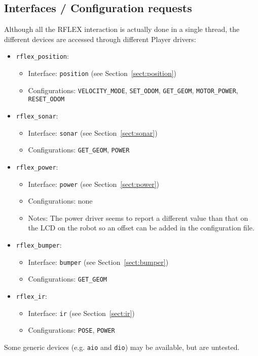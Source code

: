 \subsection*{Interfaces / Configuration requests}
Although all the RFLEX interaction is actually done in a single thread, the
different devices are accessed through different Player drivers:
\begin{itemize}
\item {\tt rflex\_position}:
  \begin{itemize}
  \item Interface: {\tt position} (see Section~\ref{sect:position})
  \item Configurations: {\tt VELOCITY\_MODE}, {\tt SET\_ODOM},
                        {\tt GET\_GEOM}, {\tt MOTOR\_POWER},
                        {\tt RESET\_ODOM}
  \end{itemize}
\item {\tt rflex\_sonar}:
  \begin{itemize}
  \item Interface: {\tt sonar} (see Section~\ref{sect:sonar})
  \item Configurations: {\tt GET\_GEOM}, {\tt POWER}
  \end{itemize}
\item {\tt rflex\_power}:
  \begin{itemize}
  \item Interface: {\tt power} (see Section~\ref{sect:power})
  \item Configurations: none
  \item Notes: The power driver seems to report a different value than that on the LCD on the robot so
  an offset can be added in the configuration file.
  \end{itemize}
\item {\tt rflex\_bumper}:
  \begin{itemize}
  \item Interface: {\tt bumper} (see Section~\ref{sect:bumper})
  \item Configurations: {\tt GET\_GEOM}
  \end{itemize}
\item {\tt rflex\_ir}:
  \begin{itemize}
  \item Interface: {\tt ir} (see Section~\ref{sect:ir})
  \item Configurations: {\tt POSE}, {\tt POWER}
  \end{itemize}

\end{itemize}
Some generic devices (e.g. {\tt aio} and {\tt dio}) may be available, but are
untested.

